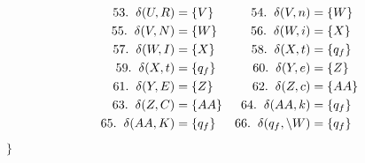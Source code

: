 \documentclass[a4paper,10pt]{article}
\begin{document}
\begin{align*}
		53. \hspace{2mm} \delta(U, R) &= \{V\} & 54. \hspace{2mm} \delta(V, n) &= \{W\} \\
		55. \hspace{2mm} \delta(V, N) &= \{W\} & 56. \hspace{2mm} \delta(W, i) &= \{X\} \\
		57. \hspace{2mm} \delta(W, I) &= \{X\} & 58. \hspace{2mm} \delta(X, t) &= \{q_f\} \\
		59. \hspace{2mm} \delta(X, t) &= \{q_f\} & 60. \hspace{2mm} \delta(Y, e) &= \{Z\} \\
		61. \hspace{2mm} \delta(Y, E) &= \{Z\} & 62. \hspace{2mm} \delta(Z, c) &= \{AA\} \\
		63. \hspace{2mm} \delta(Z, C) &= \{AA\} & 64. \hspace{2mm} \delta(AA, k) &= \{q_f\} \\
		65. \hspace{2mm} \delta(AA, K) &= \{q_f\} & 66. \hspace{2mm} \delta(q_f, \backslash W) &= \{q_f\}
	\end{align*}
	\hspace*{5mm} $\}$ \\[5mm]
	
\end{document}

